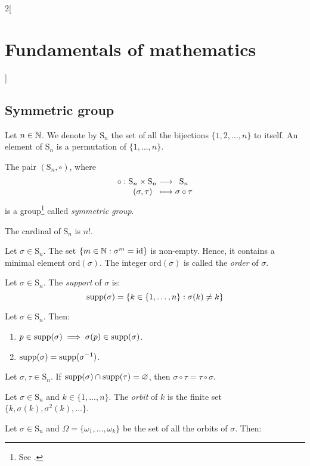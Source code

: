 \documentclass[../../../main_math.tex]{subfiles}
\begin{document}
\begin{multicols}{2}[\section{Fundamentals of mathematics}]
  \subsection{Symmetric group}
  \begin{definition}
    Let $n\in\mathbb{N}$. We denote by $\text{S}_n$ the set of all the bijections $\{1,2,\ldots,n\}$ to itself. An element of $\text{S}_n$ is a permutation of $\{1,\ldots,n\}$.
  \end{definition}
  \begin{proposition}
    The pair $(\text{S}_n,\circ)$, where
    $$\function{\circ}{\text{S}_n\times \text{S}_n}{\text{S}_n}{(\sigma,\tau)}{\sigma\circ\tau}$$
    is a group\footnote{See .} called \emph{symmetric group}.
  \end{proposition}
  \begin{theorem}
    The cardinal of $\text{S}_n$ is $n!$.
  \end{theorem}
  \begin{definition}
    Let $\sigma\in \text{S}_n$. The set $\{m\in\mathbb{N}:\sigma^m=\text{id}\}$ is non-empty. Hence, it contains a minimal element $\text{ord}(\sigma)$. The integer $\text{ord}(\sigma)$ is called the \emph{order} of $\sigma$.
  \end{definition}
  \begin{definition}
    Let $\sigma\in \text{S}_n$. The \emph{support} of $\sigma$ is: $$\operatorname{supp}(\sigma)=\{k\in\{1,\ldots,n\}: \sigma(k)\ne k\}$$
  \end{definition}
  \begin{lemma}
    Let $\sigma\in \text{S}_n$. Then:
    \begin{enumerate}
      \item $p\in\operatorname{supp}(\sigma)\implies \sigma(p)\in\operatorname{supp}(\sigma)$.
      \item $\operatorname{supp}(\sigma)=\operatorname{supp}(\sigma^{-1})$.
    \end{enumerate}
  \end{lemma}
  \begin{lemma}
    Let $\sigma,\tau\in \text{S}_n$. If $\operatorname{supp}(\sigma)\cap\operatorname{supp}(\tau)=\varnothing$, then $\sigma\circ \tau=\tau\circ \sigma$.
  \end{lemma}
  \begin{definition}
    Let $\sigma\in \text{S}_n$ and $k\in\{1,\ldots,n\}$. The \emph{orbit} of $k$ is the finite set $\{k,\sigma(k),\sigma^2(k),\ldots\}$.
  \end{definition}
  \begin{theorem}
    Let $\sigma\in \text{S}_n$ and $\Omega=\{\omega_1,\ldots,\omega_k\}$ be the set of all the orbits of $\sigma$. Then:

\end{theorem}
\end{multicols}
\end{document}
